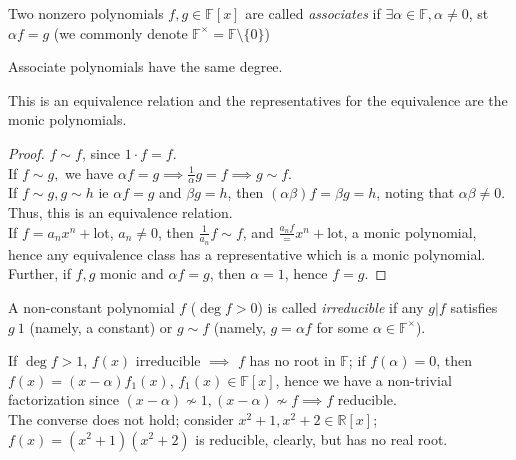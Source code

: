 \documentclass[12pt,oneside]{article}
\begin{document}
\begin{definition}[Associates]
  Two nonzero polynomials $f,g \in \mathbb{F}[x]$ are called \emph{associates} if $\exists \alpha \in \mathbb{F}, \alpha \neq 0$, st $\alpha f = g$ (we commonly denote $\mathbb{F}^{\times} = \mathbb{F}\setminus\{0\}$)
\end{definition}

\begin{remark}
  Associate polynomials have the same degree.
\end{remark}

\begin{lemma}
  This is an equivalence relation and the representatives for the equivalence are the monic polynomials.
\end{lemma}

\begin{proof}
  $f \sim f$, since $1 \cdot f = f$.\\
  If $f \sim g,$ we have $\alpha f = g \implies \frac{1}{\alpha} g = f \implies g \sim f$.\\
  If $f \sim g, g \sim h$ ie $\alpha f = g$ and $\beta g = h$, then $(\alpha \beta)f = \beta g = h$, noting that $\alpha \beta \neq 0$. Thus, this is an equivalence relation.\\
  If $f = a_n x^{n} + \text{lot}$, $a_n \neq 0$, then $\frac{1}{a_n} f \sim f$, and $\frac{a_n f} = x^{n} +\text{lot}$, a monic polynomial, hence any equivalence class has a representative which is a monic polynomial.\\
  Further, if $f, g$ monic and $\alpha f = g$, then $\alpha = 1$, hence $f = g$.
\end{proof}

\begin{definition}
  A non-constant polynomial $f$ ($\deg f > 0$) is called \emph{irreducible} if any $g | f$ satisfies $g ~ 1$ (namely, a constant) or $g \sim f$ (namely, $g = \alpha f$ for some $\alpha \in \mathbb{F}^{\times}$).\footnotemark
\end{definition}
\begin{remark}
  If $\deg f > 1$, $f(x)$ irreducible $\implies$ $f$ has no root in $\mathbb{F}$; if $f(\alpha) = 0$, then $f(x) = (x-\alpha)f_1(x)$, $f_1(x) \in \mathbb{F}[x]$, hence we have a non-trivial factorization since $(x-\alpha) \not\sim 1, (x-\alpha) \not \sim f \implies f$ reducible. \\The converse does not hold; consider $x^2 + 1, x^2 + 2 \in \mathbb{R}[x]$; $f(x) = (x^2+1)(x^2+2)$ is reducible, clearly, but has no real root.
\end{remark}
\end{document}
